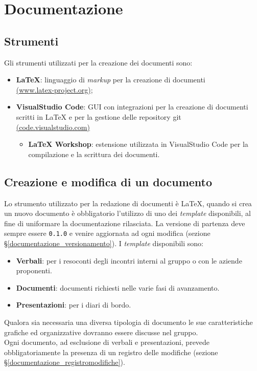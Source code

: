 \section{Documentazione}
\subsection{Strumenti}
Gli strumenti utilizzati per la creazione dei documenti sono:
\begin{itemize}
    \item \textbf{LaTeX}: linguaggio di \textit{markup} per la creazione di documenti \\
        \href{https://www.latex-project.org/}{(www.latex-project.org)};
    \item \textbf{VisualStudio Code}: GUI con integrazioni per la creazione di documenti scritti in LaTeX e per la gestione delle repository git \\
        \href{https://code.visualstudio.com/}{(code.visualstudio.com)}
        \begin{itemize}
            \item \textbf{LaTeX Workshop}: estensione utilizzata in VisualStudio Code per la compilazione e la scrittura dei documenti.
        \end{itemize}
\end{itemize}

\subsection{Creazione e modifica di un documento}
Lo strumento utilizzato per la redazione di documenti è LaTeX, quando si crea un nuovo documento è obbligatorio l'utilizzo di uno dei \textit{template} disponibili, al fine di uniformare la documentazione rilasciata.
La versione di partenza deve sempre essere \texttt{0.1.0} e venire aggiornata ad ogni modifica (sezione \S\ref{documentazione_versionamento}).
I \textit{template} disponibili sono:
\begin{itemize}
    \item \textbf{Verbali}: per i resoconti degli incontri interni al gruppo o con le aziende proponenti.
    \item \textbf{Documenti}: documenti richiesti nelle varie fasi di avanzamento.
    \item \textbf{Presentazioni}: per i diari di bordo.
\end{itemize}
Qualora sia necessaria una diversa tipologia di documento le sue caratteristiche grafiche ed organizzative dovranno essere discusse nel gruppo.\\
Ogni documento, ad esclusione di verbali e presentazioni, prevede obbligatoriamente la presenza di un registro delle modifiche (sezione \S\ref{documentazione_registromodifiche}).

